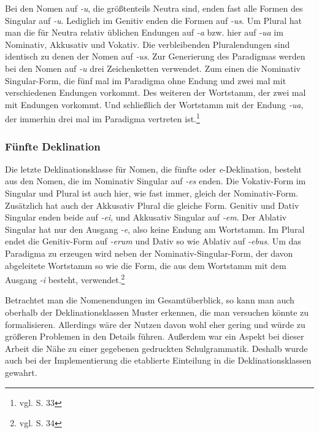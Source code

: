 Bei den Nomen auf \textit{-u}, die größtenteils Neutra sind, enden fast alle Formen des Singular auf \textit{-u}. Lediglich im Genitiv enden die Formen auf \textit{-us}. Um Plural hat man die für Neutra relativ üblichen Endungen auf \textit{-a} bzw. hier auf \textit{-ua} im Nominativ, Akkusativ und Vokativ. Die verbleibenden Pluralendungen sind identisch zu denen der Nomen auf \textit{-us}. Zur Generierung des Paradigmas werden bei den Nomen auf \textit{-u} drei Zeichenketten verwendet. Zum einen die Nominativ Singular-Form, die fünf mal im Paradigma ohne Endung und zwei mal mit verschiedenen Endungen vorkommt. Des weiteren der Wortstamm, der zwei mal mit Endungen vorkommt. Und schließlich der Wortstamm mit der Endung \textit{-ua}, der immerhin drei mal im Paradigma vertreten ist.\footnote{vgl. \cite{BAYER-LINDAUER1994} S. 33} \par
\subsubsection{Fünfte Deklination}
Die letzte Deklinationsklasse für Nomen, die fünfte oder \textit{e}-Deklination, besteht aus den Nomen, die im Nominativ Singular auf \textit{-es} enden. Die Vokativ-Form im Singular und Plural ist auch hier, wie fast immer, gleich der Nominativ-Form. Zusätzlich hat auch der Akkusativ Plural die gleiche Form. Genitiv und Dativ Singular enden beide auf \textit{-ei}, und Akkusativ Singular auf \textit{-em}. Der Ablativ Singular hat nur den Ausgang \textit{-e}, also keine Endung am Wortstamm. Im Plural endet die Genitiv-Form auf \textit{-erum} und Dativ so wie Ablativ auf \textit{-ebus}. Um das Paradigma zu erzeugen wird neben der Nominativ-Singular-Form, der davon abgeleitete Wortstamm so wie die Form, die aus dem Wortstamm mit dem Ausgang \textit{-i} besteht, verwendet.\footnote{vgl. \cite{BAYER-LINDAUER1994} S. 34} \par
Betrachtet man die Nomenendungen im Gesamtüberblick, so kann man auch oberhalb der Deklinationsklassen Muster erkennen, die man versuchen könnte zu formalisieren. Allerdings wäre der Nutzen davon wohl eher gering und würde zu größeren Problemen in den Details führen. Außerdem war ein Aspekt bei dieser Arbeit die Nähe zu einer gegebenen gedruckten Schulgrammatik. Deshalb wurde auch bei der Implementierung die etablierte Einteilung in die Deklinationsklassen gewahrt.
